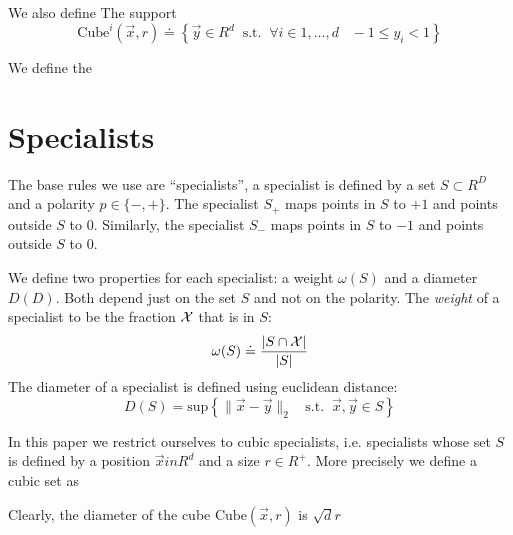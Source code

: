 \documentclass{article}
\newcommand{\X}{{\cal X}}
\newcommand{\x}{\vec{x}}
\newcommand{\y}{\vec{y}}
\newcommand{\polarity}{p}
\newcommand{\diameter}{D}
\newcommand{\weight}{\omega}
\begin{document}
We also define The support 
\[
\text{Cube}^i\left(\x,r\right) \doteq
\left\{\y \in R^d\;\; \text{s.t.}\;\; \forall i \in 1,\ldots,d\;\;\; -1
\leq y_i < 1   \right\}
\]




We define the 


\section{Specialists}

The base rules we use are ``specialists'', a specialist is defined by
a set $S \subset R^D$ and a polarity $\polarity \in \{-,+\}$. The
specialist $S_+$ maps points in $S$ to $+1$ and points outside $S$ to
$0$. Similarly, the specialist $S_-$ maps points in $S$ to $-1$ and
points outside $S$ to $0$.

We define two properties for each specialist: a weight $\weight(S)$
and a diameter $\diameter(D)$. Both depend just on the set $S$ and not
on the polarity. The {\em weight} of a specialist to be the fraction $\X$
that is in $S$:
\[
\weight(S) \doteq \frac{|S \cap \X|}{|S|}
\]
The diameter of a specialist is defined using euclidean distance:
\[
\diameter(S) = \text{sup} \left\{ \|\x-\y \|_2 \;\;\text{ s.t.}\;\;   \x,\y
\in S \right\}
\]

In this paper we restrict ourselves to cubic specialists,
i.e. specialists whose set $S$ is defined by a position $\x in R^d$
and a size $r \in R^+$. More precisely we define a cubic set as

Clearly, the diameter of the cube $\text{Cube}(\x,r)$ is $\sqrt{d} r$
\end{document}
